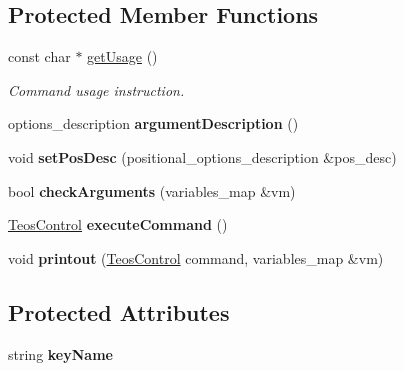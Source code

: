 \subsection*{Protected Member Functions}
\begin{DoxyCompactItemize}
\item 
const char $\ast$ \mbox{\hyperlink{classteos_1_1command_1_1_create_key_options_ac4c7176d534ed832ebfc954e36238a4c}{get\+Usage}} ()
\begin{DoxyCompactList}\small\item\em Command \textquotesingle{}usage\textquotesingle{} instruction. \end{DoxyCompactList}\item 
\mbox{\label{classteos_1_1command_1_1_create_key_options_ad05b210e6e7f9930ed7438ab21257a34}} 
options\+\_\+description {\bfseries argument\+Description} ()
\item 
\mbox{\label{classteos_1_1command_1_1_create_key_options_aaead04dd480db9516e8ccdfd4533b949}} 
void {\bfseries set\+Pos\+Desc} (positional\+\_\+options\+\_\+description \&pos\+\_\+desc)
\item 
\mbox{\label{classteos_1_1command_1_1_create_key_options_a46cc7933de9c2a71c111bdcfd9a327a8}} 
bool {\bfseries check\+Arguments} (variables\+\_\+map \&vm)
\item 
\mbox{\label{classteos_1_1command_1_1_create_key_options_af47c20b59e773febdfb5f1e2ed0ea735}} 
\mbox{\hyperlink{classteos_1_1_teos_control}{Teos\+Control}} {\bfseries execute\+Command} ()
\item 
\mbox{\label{classteos_1_1command_1_1_create_key_options_a94087926f6ea43b7c05d57f86ae8995b}} 
void {\bfseries printout} (\mbox{\hyperlink{classteos_1_1_teos_control}{Teos\+Control}} command, variables\+\_\+map \&vm)
\end{DoxyCompactItemize}
\subsection*{Protected Attributes}
\begin{DoxyCompactItemize}
\item 
\mbox{\label{classteos_1_1command_1_1_create_key_options_a0e908701e5d4f6a5583ef1fdd244da37}} 
string {\bfseries key\+Name}
\end{DoxyCompactItemize}
